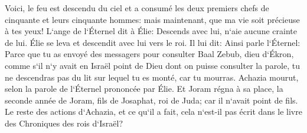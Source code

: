 \verse Voici, le feu est descendu du ciel et a consumé les deux premiers chefs de cinquante et leurs cinquante hommes: mais maintenant, que ma vie soit précieuse à tes yeux! 
\verse L`ange de l`Éternel dit à Élie: Descends avec lui, n`aie aucune crainte de lui. Élie se leva et descendit avec lui vers le roi. 
\verse Il lui dit: Ainsi parle l`Éternel: Parce que tu as envoyé des messagers pour consulter Baal Zebub, dieu d`Ékron, comme s`il n`y avait en Israël point de Dieu dont on puisse consulter la parole, tu ne descendras pas du lit sur lequel tu es monté, car tu mourras. 
\verse Achazia mourut, selon la parole de l`Éternel prononcée par Élie. Et Joram régna à sa place, la seconde année de Joram, fils de Josaphat, roi de Juda; car il n`avait point de fils. 
\verse Le reste des actions d`Achazia, et ce qu`il a fait, cela n`est-il pas écrit dans le livre des Chroniques des rois d`Israël? 

